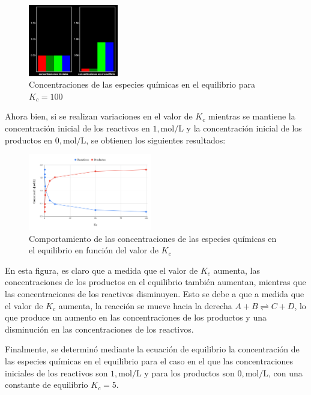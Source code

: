 \documentclass[10pt]{article}
\begin{document}
\begin{multicols*}{2}
\begin{itemize}
                \begin{figure}[H]
                    \centering
                    \includegraphics[width=0.35\textwidth]{img/lab100.png}
                    \caption{Concentraciones de las especies químicas en el equilibrio para $K_c = 100$}
                \end{figure}
        \end{itemize}

        Ahora bien, si se realizan variaciones en el valor de $K_c$ mientras se mantiene la concentración inicial de los reactivos en $1 , \text{mol/L}$ y la concentración inicial de los productos en $0 , \text{mol/L}$, se obtienen los siguientes resultados:

        \begin{figure}[H]
            \centering
            \includegraphics[width=0.48\textwidth]{img/chart.png}
            \caption{Comportamiento de las concentraciones de las especies químicas en el equilibrio en función del valor de $K_c$}
        \end{figure}

        En esta figura, es claro que a medida que el valor de $K_c$ aumenta, las concentraciones de los productos en el equilibrio también aumentan, mientras que las concentraciones de los reactivos disminuyen. Esto se debe a que a medida que el valor de $K_c$ aumenta, la reacción se mueve hacia la derecha $A + B \rightleftharpoons C + D$, lo que produce un aumento en las concentraciones de los productos y una disminución en las concentraciones de los reactivos.

        Finalmente, se determinó mediante la ecuación de equilibrio la concentración de las especies químicas en el equilibrio para el caso en el que las concentraciones iniciales de los reactivos son $1 , \text{mol/L}$ y para los productos son $0 , \text{mol/L}$, con una constante de equilibrio $K_c = 5$.


\end{multicols*}
\end{document}

